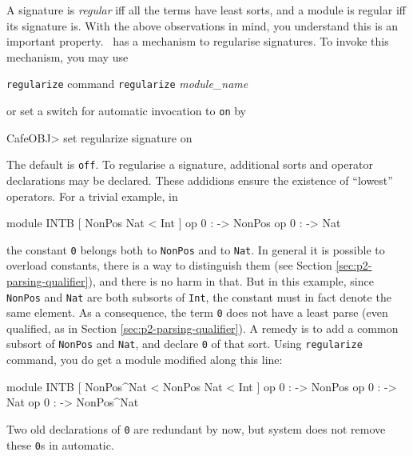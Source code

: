 \documentclass[a4paper]{memoir}
\begin{document}
A signature is {\em regular} iff all the
terms have least sorts, and a module is regular iff its signature is.
With the above observations in mind, you understand
this is an important property.
\cafeobj~has a mechanism to regularise signatures. To invoke this
mechanism, you may use

\begin{bsyntax} \texttt{regularize} command  \Hline
\texttt{regularize} \textit{module\_name}
\end{bsyntax}

or set a switch for automatic invocation to \verb|on| by
\begin{vvtm}
\begin{ccode}
  CafeOBJ> set regularize signature on
\end{ccode}
\end{vvtm}
The default is \verb|off|. To regularise a signature, additional sorts and
operator declarations may be declared. These addidions ensure the existence
of ``lowest'' operators. For a trivial example, in
\begin{vvtm}
\begin{ccode}
  module INTB {
    [ NonPos Nat < Int ]
    op 0 : -> NonPos
    op 0 : -> Nat
  }
\end{ccode}
\end{vvtm}
\label{exs:intb}
the constant \verb|0| belongs both to \verb|NonPos| and to \verb|Nat|.
In general it is possible to overload constants, there is a way to
distinguish them (see Section \ref{sec:p2-parsing-qualifier}), and
there is no harm in that. But in this example, since \verb|NonPos|
and \verb|Nat| are both subsorts of \verb|Int|, the constant must
in fact denote the same element. As a consequence, the term \verb|0|
does not have a least parse (even qualified,
as in Section \ref{sec:p2-parsing-qualifier}).
A remedy is to add a common subsort of \verb|NonPos| and \verb|Nat|,
and declare \verb|0| of that sort.
Using \verb|regularize| command, you do get a module modified along
this line:
\begin{vvtm}
\begin{ccode}
  module INTB {
    [ NonPos^Nat < NonPos Nat < Int ]
    op 0 : -> NonPos
    op 0 : -> Nat
    op 0 : -> NonPos^Nat
  }
\end{ccode}
\end{vvtm}
Two old declarations of \verb|0| are redundant by now, but system 
does not remove these \verb|0|s in automatic.
\end{document}
